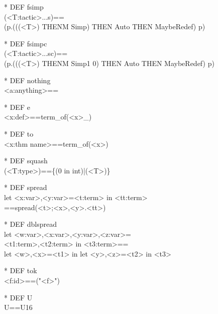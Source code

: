 \begin{prl*}
\>* DEF fsimp\\
\>  (<T:tactic>...s)==\\
\>  (\mbackslash{}p.(((<T>) THENM Simp) THEN Auto THEN MaybeRedef) p)
\end{prl*}

\begin{prl*}
\>* DEF fsimpc\\
\>  (<T:tactic>...sc)==\\
\>  (\mbackslash{}p.(((<T>) THENM Simp1 0) THEN Auto THEN MaybeRedef) p)
\end{prl*}

\begin{prl*}
\>* DEF nothing\\
\>  <a:anything>==
\end{prl*}

\begin{prl*}
\>* DEF e\\
\>  <x:def>==term\_of(<x>\_)
\end{prl*}

\begin{prl*}
\>* DEF to\\
\>  <x:thm name>==term\_of(<x>)
\end{prl*}

\begin{prl*}
\>* DEF squash\\
\>  \mdownarrow{}(<T:type>)==\{(0 in int)|(<T>)\}
\end{prl*}

\begin{prl*}
\>* DEF spread\\
\>  let <x:var>,<y:var>=<t:term> in <tt:term>\\
\>  ==spread(<t>;<x>,<y>.<tt>)
\end{prl*}

\begin{prl*}
\>* DEF dblspread\\
\>  let <w:var>,<x:var>,<y:var>,<z:var>=\\
\>  <t1:term>,<t2:term> in <t3:term>==\\
\>  let <w>,<x>=<t1> in let <y>,<z>=<t2> in <t3>
\end{prl*}

\begin{prl*}
\>* DEF tok\\
\>  <f:id>==("<f>")
\end{prl*}

\begin{prl*}
\>* DEF U\\
\>  U==U16
\end{prl*}

